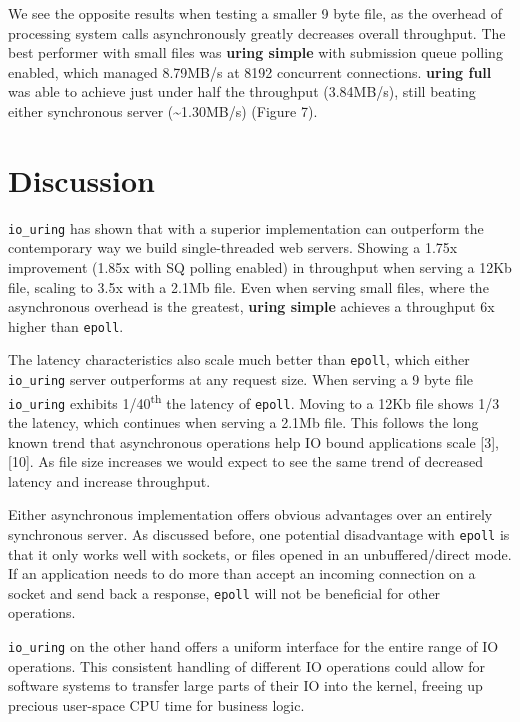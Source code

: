 \documentclass[conference]{IEEEtran}{}
\makeatletter
\newcommand{\citeprocitem}[2]{\hyper@linkstart{cite}{citeproc_bib_item_#1}#2\hyper@linkend}
\makeatother
\begin{document}
We see the opposite results when testing a smaller 9 byte file, as the overhead of processing system calls asynchronously greatly decreases overall throughput. The best performer with small files was \textbf{uring simple} with submission queue polling enabled, which managed 8.79MB/s at 8192 concurrent connections. \textbf{uring full} was able to achieve just under half the throughput (3.84MB/s), still beating either synchronous server (\textasciitilde{}1.30MB/s) (Figure 7).

\section{Discussion}
\label{sec:org433e18c}
\texttt{io\_uring} has shown that with a superior implementation can outperform the contemporary way we build single-threaded web servers. Showing a 1.75x improvement (1.85x with SQ polling enabled) in throughput when serving a 12Kb file, scaling to 3.5x with a 2.1Mb file. Even when serving small files, where the asynchronous overhead is the greatest, \textbf{uring simple} achieves a throughput 6x higher than \texttt{epoll}.

The latency characteristics also scale much better than \texttt{epoll}, which either \texttt{io\_uring} server outperforms at any request size. When serving a 9 byte file \texttt{io\_uring} exhibits 1/40\textsuperscript{th} the latency of \texttt{epoll}. Moving to a 12Kb file shows 1/3 the latency, which continues when serving a 2.1Mb file. This follows the long known trend that asynchronous operations help IO bound applications scale \citeprocitem{3}{[3]}, \citeprocitem{10}{[10]}. As file size increases we would expect to see the same trend of decreased latency and increase throughput.

Either asynchronous implementation offers obvious advantages over an entirely synchronous server. As discussed before, one potential disadvantage with \texttt{epoll} is that it only works well with sockets, or files opened in an unbuffered/direct mode. If an application needs to do more than accept an incoming connection on a socket and send back a response, \texttt{epoll} will not be beneficial for other operations.

\texttt{io\_uring} on the other hand offers a uniform interface for the entire range of IO operations. This consistent handling of different IO operations could allow for software systems to transfer large parts of their IO into the kernel, freeing up precious user-space CPU time for business logic.
\end{document}
